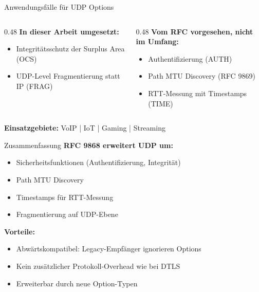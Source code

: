 \documentclass[aspectratio=169]{beamer}
\begin{document}
\begin{frame}{Anwendungsfälle für UDP Options}
\begin{columns}[T]
\begin{column}{0.48\textwidth}
\textbf{In dieser Arbeit umgesetzt:}
\begin{itemize}
    \item Integritätsschutz der Surplus Area (OCS)
    \item UDP-Level Fragmentierung statt IP (FRAG)
\end{itemize}
\end{column}
\begin{column}{0.48\textwidth}
\textbf{Vom RFC vorgesehen, nicht im Umfang:}
\begin{itemize}
    \item Authentifizierung (AUTH)
    \item Path MTU Discovery (RFC 9869)
    \item RTT-Messung mit Timestamps (TIME)
\end{itemize}
\end{column}
\end{columns}

\vspace{2em}
\centering
\textbf{Einsatzgebiete:} \quad VoIP \quad | \quad IoT \quad | \quad Gaming \quad | \quad Streaming
\end{frame}

\begin{frame}{Zusammenfassung}
\textbf{RFC 9868 erweitert UDP um:}
\begin{itemize}
    \item Sicherheitsfunktionen (Authentifizierung, Integrität)
    \item Path MTU Discovery
    \item Timestamps für RTT-Messung
    \item Fragmentierung auf UDP-Ebene
\end{itemize}

\vspace{1em}
\textbf{Vorteile:}
\begin{itemize}
    \item Abwärtskompatibel: Legacy-Empfänger ignorieren Options
    \item Kein zusätzlicher Protokoll-Overhead wie bei DTLS
    \item Erweiterbar durch neue Option-Typen
\end{itemize}

\end{frame}
\end{document}
